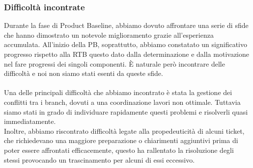 \documentclass[5pt]{article}
\begin{document}
    \subsubsection{Difficoltà incontrate}
    Durante la fase di Product Baseline, abbiamo dovuto affrontare una serie di sfide che hanno dimostrato un notevole miglioramento grazie all'esperienza accumulata. All'inizio della PB, soprattutto, abbiamo constatato un significativo progresso rispetto alla RTB questo dato dalla determinazione e dalla motivazione nel fare progressi dei singoli componenti.
    È naturale però incontrare delle difficoltà e noi non siamo stati esenti da queste sfide.\\\\
    Una delle principali difficoltà che abbiamo incontrato è stata la gestione dei conflitti tra i branch, dovuti a una coordinazione lavori non ottimale. Tuttavia siamo stati in grado di individuare rapidamente questi problemi e risolverli quasi immediatamente.\\
    Inoltre, abbiamo riscontrato difficoltà legate alla propedeuticità di alcuni ticket, che richiedevano una maggiore preparazione o chiarimenti aggiuntivi prima di poter essere affrontati efficacemente, questo ha rallentato la risoluzione degli stessi provocando un trascinamento per alcuni di essi eccessivo.
    
\end{document}
